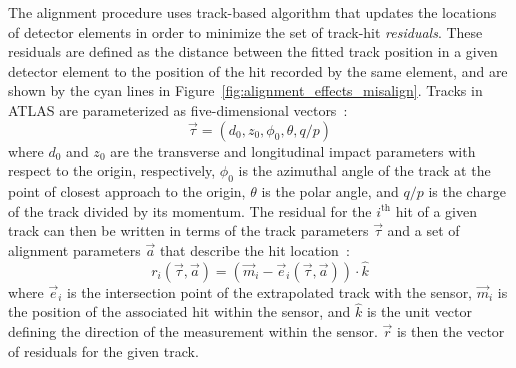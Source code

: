 The alignment procedure uses track-based algorithm that updates the locations of detector elements in order to minimize the set of track-hit \emph{residuals}.
These residuals are defined as the distance between the fitted track position in a given detector element to the position of the hit recorded by the same element, and are shown by the cyan lines in Figure~\ref{fig:alignment_effects_misalign}.
Tracks in ATLAS are parameterized as five-dimensional vectors~\cite{2006.atlas-tracking-model}:%
\begin{equation}
  \vec{\tau} = (d_0,z_0,\phi_0,\theta,q/p)
\end{equation}
where $d_0$ and $z_0$ are the transverse and longitudinal impact parameters with respect to the origin, respectively, $\phi_0$ is the azimuthal angle of the track at the point of closest approach to the origin, $\theta$ is the polar angle, and $q/p$ is the charge of the track divided by its momentum.
The residual for the $i^{\textrm{th}}$ hit of a given track can then be written in terms of the track parameters $\vec{\tau}$ and a set of alignment parameters $\vec{a}$ that describe the hit location~\cite{2005.global-chi2-alignment}:
\begin{equation}
  r_i(\vec{\tau},\vec{a}) = (\vec{m}_i - \vec{e}_i (\vec{\tau},\vec{a}))\cdot\hat{k}
\end{equation}
where $\vec{e}_i$ is the intersection point of the extrapolated track with the sensor, $\vec{m}_i$ is the position of the associated hit within the sensor, and $\hat{k}$ is the unit vector defining the direction of the measurement within the sensor.
$\vec{r}$ is then the vector of residuals for the given track.

